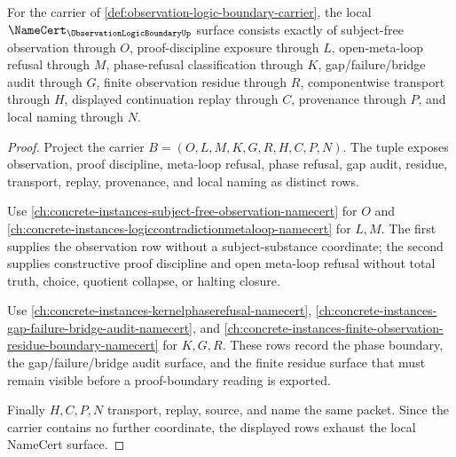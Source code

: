 \begin{theorem}
\label{thm:observation-logic-boundary-namecert-obligations}
For the carrier of \autoref{def:observation-logic-boundary-carrier}, the local $\NameCert_{\ObservationLogicBoundaryUp}$ surface consists exactly of subject-free observation through $O$, proof-discipline exposure through $L$, open-meta-loop refusal through $M$, phase-refusal classification through $K$, gap/failure/bridge audit through $G$, finite observation residue through $R$, componentwise transport through $H$, displayed continuation replay through $C$, provenance through $P$, and local naming through $N$.
\end{theorem}
\begin{proof}
Project the carrier $B=(O,L,M,K,G,R,H,C,P,N)$. The tuple exposes observation, proof discipline, meta-loop refusal, phase refusal, gap audit, residue, transport, replay, provenance, and local naming as distinct rows.

Use \autoref{ch:concrete-instances-subject-free-observation-namecert} for $O$ and \autoref{ch:concrete-instances-logiccontradictionmetaloop-namecert} for $L,M$. The first supplies the observation row without a subject-substance coordinate; the second supplies constructive proof discipline and open meta-loop refusal without total truth, choice, quotient collapse, or halting closure.

Use \autoref{ch:concrete-instances-kernelphaserefusal-namecert}, \autoref{ch:concrete-instances-gap-failure-bridge-audit-namecert}, and \autoref{ch:concrete-instances-finite-observation-residue-boundary-namecert} for $K,G,R$. These rows record the phase boundary, the gap/failure/bridge audit surface, and the finite residue surface that must remain visible before a proof-boundary reading is exported.

Finally $H,C,P,N$ transport, replay, source, and name the same packet. Since the carrier contains no further coordinate, the displayed rows exhaust the local NameCert surface.
\end{proof}

